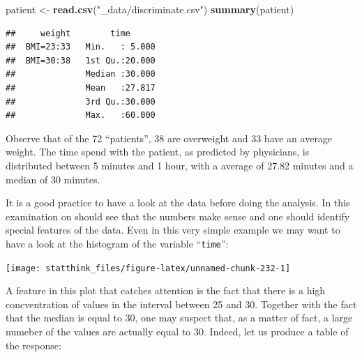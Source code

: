 \documentclass[]{krantz}
\makeatletter
\newenvironment{Shaded}{\begin{snugshade}}{\end{snugshade}}
\newcommand{\KeywordTok}[1]{\textcolor[rgb]{0.13,0.29,0.53}{\textbf{#1}}}
\newcommand{\NormalTok}[1]{#1}
\newcommand{\OperatorTok}[1]{\textcolor[rgb]{0.81,0.36,0.00}{\textbf{#1}}}
\newcommand{\StringTok}[1]{\textcolor[rgb]{0.31,0.60,0.02}{#1}}
\newenvironment{kframe}{%
\medskip{}
\setlength{\fboxsep}{.8em}
 \def\at@end@of@kframe{}%
 \ifinner\ifhmode%
  \def\at@end@of@kframe{\end{minipage}}%
  \begin{minipage}{\columnwidth}%
 \fi\fi%
 \def\FrameCommand##1{\hskip\@totalleftmargin \hskip-\fboxsep
 \colorbox{shadecolor}{##1}\hskip-\fboxsep
     \hskip-\linewidth \hskip-\@totalleftmargin \hskip\columnwidth}%
 \MakeFramed {\advance\hsize-\width
   \@totalleftmargin\z@ \linewidth\hsize
   \@setminipage}}%
 {\par\unskip\endMakeFramed%
 \at@end@of@kframe}
\renewenvironment{Shaded}{\begin{kframe}}{\end{kframe}}
\theoremstyle{definition}
\theoremstyle{definition}
\theoremstyle{definition}
\theoremstyle{remark}
\makeatother
\begin{document}
\begin{Shaded}
\begin{Highlighting}[]
\NormalTok{patient <-}\StringTok{ }\KeywordTok{read.csv}\NormalTok{(}\StringTok{"_data/discriminate.csv"}\NormalTok{)}
\KeywordTok{summary}\NormalTok{(patient)}
\end{Highlighting}
\end{Shaded}

\begin{verbatim}
##     weight        time       
##  BMI=23:33   Min.   : 5.000  
##  BMI=30:38   1st Qu.:20.000  
##              Median :30.000  
##              Mean   :27.817  
##              3rd Qu.:30.000  
##              Max.   :60.000
\end{verbatim}

Observe that of the 72 ``patients'', 38 are overweight and 33 have an
average weight. The time spend with the patient, as predicted by
physicians, is distributed between 5 minutes and 1 hour, with a average
of 27.82 minutes and a median of 30 minutes.

It is a good practice to have a look at the data before doing the
analysis. In this examination on should see that the numbers make sense
and one should identify special features of the data. Even in this very
simple example we may want to have a look at the histogram of the
variable ``\texttt{time}'':

\begin{Shaded}
\end{Shaded}

\begin{center}\texttt{[image: statthink\_files/figure-latex/unnamed-chunk-232-1]} \end{center}

A feature in this plot that catches
attention is the fact that there is a high concventration of values in
the interval between 25 and 30. Together with the fact that the median
is equal to 30, one may suspect that, as a matter of fact, a large
numeber of the values are actually equal to 30. Indeed, let us produce a
table of the response:

\begin{Shaded}
\end{Shaded}
\end{document}
